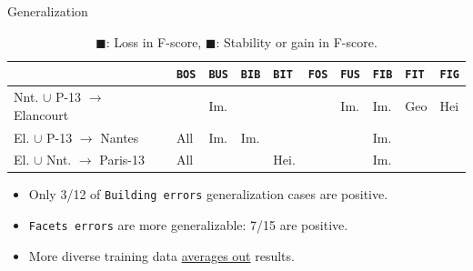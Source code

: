 \documentclass[10pt, export]{beamer}
\begin{document}
\begin{frame}{Generalization}
{\begin{table}
\begin{center}
\begin{tabular}{| x{1.5cm}| x{.4cm} | x{.4cm} | x{.4cm} | x{.4cm} | x{.4cm} | x{.4cm} | x{.4cm} | x{.4cm} | x{.4cm} |}
                            \hline
                            &\texttt{BOS}  & \texttt{BUS} &\texttt{BIB} &\texttt{BIT} &\texttt{FOS}  & \texttt{FUS} &\texttt{FIB} &\texttt{FIT} &\texttt{FIG} \\
                            \hline
                            Nnt. $\cup$ P-13 $\rightarrow$ Elancourt & & Im.& & & &Im. &Im. &Geo &  Hei\\
                            \hline
                            El. $\cup$ P-13 $\rightarrow$ Nantes   & All& Im.&Im. & & & & Im.&  &\\
                            \hline
                            El. $\cup$ Nnt. $\rightarrow$ Paris-13   &All & &  &Hei. & & &Im. &  &\\
                            \hline
                        \end{tabular}
                        \caption{\footnotesize \textcolor{IGNRed}{$\blacksquare$}: Loss in F-score, \textcolor{IGNGreen}{$\blacksquare$}: Stability or gain in F-score.}
                    \end{center}
                \end{table}
                \begin{itemize}[label=$\blacktriangleright$, font=\color{IGNGreen}]
                    \item<2-> \footnotesize Only 3/12 of \texttt{Building errors} generalization cases are \textcolor{IGNGreen}{positive}.
                    \item<3-> \footnotesize \texttt{Facets errors} are more generalizable: 7/15 are \textcolor{IGNGreen}{positive}.
                    \item<4-> \footnotesize More diverse training data \underline{averages out} results.
                \end{itemize}
            }
        \end{frame}
\end{document}
